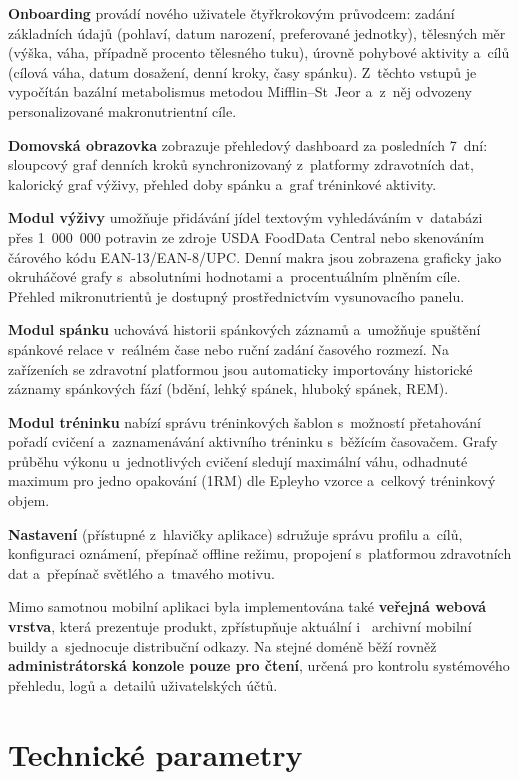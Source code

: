 \textbf{Onboarding} provádí nového uživatele čtyřkrokovým průvodcem:
zadání základních údajů (pohlaví, datum narození, preferované
jednotky), tělesných měr (výška, váha, případně procento tělesného
tuku), úrovně pohybové aktivity a~cílů (cílová váha, datum dosažení,
denní kroky, časy spánku). Z~těchto vstupů je vypočítán bazální
metabolismus metodou Mifflin–St~Jeor a~z~něj odvozeny personalizované
makronutrientní cíle.

\textbf{Domovská obrazovka} zobrazuje přehledový dashboard za
posledních 7~dní: sloupcový graf denních kroků synchronizovaný
z~platformy zdravotních dat, kalorický graf výživy, přehled doby
spánku a~graf tréninkové aktivity.

\textbf{Modul výživy} umožňuje přidávání jídel textovým vyhledáváním
v~databázi přes 1~000~000 potravin ze zdroje USDA FoodData
Central nebo skenováním čárového kódu EAN-13/EAN-8/UPC. Denní makra
jsou zobrazena graficky jako okruháčové grafy s~absolutními hodnotami
a~procentuálním plněním cíle. Přehled mikronutrientů je dostupný
prostřednictvím vysunovacího panelu.

\textbf{Modul spánku} uchovává historii spánkových záznamů a~umožňuje
spuštění spánkové relace v~reálném čase nebo ruční zadání časového
rozmezí. Na zařízeních se zdravotní platformou jsou automaticky
importovány historické záznamy spánkových fází (bdění, lehký spánek,
hluboký spánek, REM).

\textbf{Modul tréninku} nabízí správu tréninkových šablon s~možností
přetahování pořadí cvičení a~zaznamenávání aktivního tréninku
s~běžícím časovačem. Grafy průběhu výkonu u~jednotlivých cvičení
sledují maximální váhu, odhadnuté maximum pro jedno opakování
(1RM) dle Epleyho vzorce a~celkový tréninkový objem.

\textbf{Nastavení} (přístupné z~hlavičky aplikace) sdružuje správu
profilu a~cílů, konfiguraci oznámení, přepínač offline režimu,
propojení s~platformou zdravotních dat a~přepínač světlého
a~tmavého motivu.

Mimo samotnou mobilní aplikaci byla implementována také \textbf{veřejná
webová vrstva}, která prezentuje produkt, zpřístupňuje aktuální i~
archivní mobilní buildy a~sjednocuje distribuční odkazy. Na stejné
doméně běží rovněž \textbf{administrátorská konzole pouze pro čtení},
určená pro kontrolu systémového přehledu, logů a~detailů uživatelských
účtů.

\section{Technické parametry}

